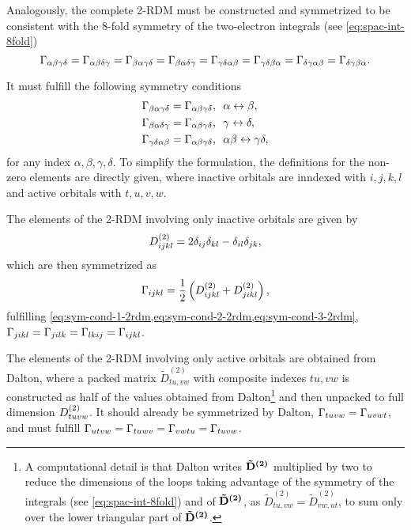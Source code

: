 Analogously, the complete 2-RDM must be constructed and symmetrized
to be consistent with the 8-fold symmetry of the
two-electron integrals (see \cref{eq:spac-int-8fold})
\begin{equation} \label{eq:sym-2rdm}
    \Gamma_{\alpha \beta \gamma \delta } = 
    \Gamma_{\alpha \beta \delta \gamma } = 
    \Gamma_{\beta \alpha \gamma \delta } = 
    \Gamma_{\beta \alpha \delta \gamma } = 
    \Gamma_{\gamma \delta \alpha \beta } = 
    \Gamma_{\gamma \delta \beta \alpha } = 
    \Gamma_{\delta \gamma \alpha \beta } = 
    \Gamma_{\delta \gamma \beta \alpha }
    .
\end{equation}

It must fulfill the following symmetry conditions
\begin{align}
    \label{eq:sym-cond-1-2rdm}
    \Gamma_{\beta\alpha\gamma\delta} = \Gamma_{\alpha\beta\gamma\delta},\ \ & \alpha \leftrightarrow \beta ,\\
    \label{eq:sym-cond-2-2rdm}
    \Gamma_{\beta\alpha\delta\gamma} = \Gamma_{\alpha\beta\gamma\delta},\ \ & \gamma \leftrightarrow \delta ,\\         
    \label{eq:sym-cond-3-2rdm}
    \Gamma_{\gamma\delta\alpha\beta} = \Gamma_{\alpha\beta\gamma\delta},\ \ & \alpha\beta \leftrightarrow \gamma \delta , 
\end{align}
for any index $\alpha, \beta, \gamma, \delta$.
To simplify the formulation, the definitions for the non-zero elements are
directly given, where inactive orbitals are
inndexed with $i,j,k,l$ and active orbitals with $t,u,v,w$.

The elements of the 2-RDM involving only inactive orbitals are given by 
\begin{equation}
    D^{\left( 2 \right)}_{ijkl} = 
    2 \delta_{ij} \delta_{kl} - \delta_{il} \delta_{jk}
    ,
\end{equation}
which are then symmetrized as 
\begin{equation}
    \Gamma_{ijkl} =
    \frac{1}{2} \left( D^{\left( 2 \right)}_{ijkl} + D^{\left( 2 \right)}_{jikl} \right)
    ,
\end{equation}
fulfilling \cref{eq:sym-cond-1-2rdm,eq:sym-cond-2-2rdm,eq:sym-cond-3-2rdm}, 
$\Gamma_{jikl} = \Gamma_{jilk} = \Gamma_{lkij} = \Gamma_{ijkl}$.

The elements of the 2-RDM involving only active orbitals are obtained from Dalton,
where a packed matrix $\tilde{D}_{tu,vw}^{(2)}$ with composite indexes $tu,vw$ is
constructed as half of the values obtained from Dalton\footnote{A computational
    detail is that Dalton writes $\boldsymbol{\mathrm{\tilde{D}^{(2)}}}$ multiplied by two to
    reduce the dimensions of the loops taking advantage of the symmetry of the
    integrals (see \cref{eq:spac-int-8fold}) and of $\boldsymbol{\mathrm{\tilde{D}^{(2)}}}$, as 
    $\tilde{D}_{tu,vw}^{(2)} = \tilde{D}_{vw,ut}^{(2)}$,
    to sum only over the lower triangular part of $ \boldsymbol{\mathrm{\tilde{D}^{(2)}}}$.
} and then
unpacked to full dimension $D^{\left( 2 \right)}_{tuvw}$.
It should already be symmetrized by Dalton, $\Gamma_{tuvw} = \Gamma_{uvwt}$, and
must fulfill
$\Gamma_{utvw} = \Gamma_{tuwv} = \Gamma_{vwtu} = \Gamma_{tuvw}$.

